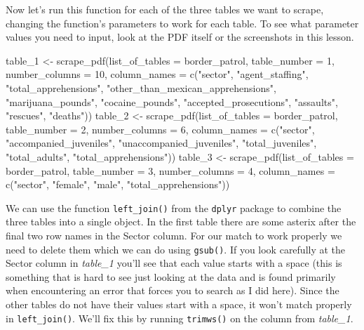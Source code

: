 \documentclass[
]{krantz}
\makeatletter
\newenvironment{Shaded}{\begin{snugshade}}{\end{snugshade}}
\newcommand{\AttributeTok}[1]{\textcolor[rgb]{0.61,0.61,0.61}{#1}}
\newcommand{\DecValTok}[1]{\textcolor[rgb]{0.06,0.06,0.06}{#1}}
\newcommand{\FunctionTok}[1]{\textcolor[rgb]{0,0,0}{#1}}
\newcommand{\NormalTok}[1]{#1}
\newcommand{\OtherTok}[1]{\textcolor[rgb]{0.37,0.37,0.37}{#1}}
\newcommand{\StringTok}[1]{\textcolor[rgb]{0.5,0.5,0.5}{#1}}
\newenvironment{kframe}{%
\medskip{}
\setlength{\fboxsep}{.8em}
 \def\at@end@of@kframe{}%
 \ifinner\ifhmode%
  \def\at@end@of@kframe{\end{minipage}}%
  \begin{minipage}{\columnwidth}%
 \fi\fi%
 \def\FrameCommand##1{\hskip\@totalleftmargin \hskip-\fboxsep
 \colorbox{shadecolor}{##1}\hskip-\fboxsep
     \hskip-\linewidth \hskip-\@totalleftmargin \hskip\columnwidth}%
 \MakeFramed {\advance\hsize-\width
   \@totalleftmargin\z@ \linewidth\hsize
   \@setminipage}}%
 {\par\unskip\endMakeFramed%
 \at@end@of@kframe}
\renewenvironment{Shaded}{\begin{kframe}}{\end{kframe}}
\makeatother
\begin{document}
Now let's run this function for each of the three tables we want to scrape, changing the function's parameters to work for each table. To see what parameter values you need to input, look at the PDF itself or the screenshots in this lesson.

\begin{Shaded}
\begin{Highlighting}[]
\NormalTok{table\_1 }\OtherTok{\textless{}{-}} \FunctionTok{scrape\_pdf}\NormalTok{(}\AttributeTok{list\_of\_tables =}\NormalTok{ border\_patrol, }\AttributeTok{table\_number =} \DecValTok{1}\NormalTok{,}
  \AttributeTok{number\_columns =} \DecValTok{10}\NormalTok{, }\AttributeTok{column\_names =} \FunctionTok{c}\NormalTok{(}\StringTok{"sector"}\NormalTok{, }\StringTok{"agent\_staffing"}\NormalTok{,}
    \StringTok{"total\_apprehensions"}\NormalTok{, }\StringTok{"other\_than\_mexican\_apprehensions"}\NormalTok{,}
    \StringTok{"marijuana\_pounds"}\NormalTok{, }\StringTok{"cocaine\_pounds"}\NormalTok{, }\StringTok{"accepted\_prosecutions"}\NormalTok{,}
    \StringTok{"assaults"}\NormalTok{, }\StringTok{"rescues"}\NormalTok{, }\StringTok{"deaths"}\NormalTok{))}
\NormalTok{table\_2 }\OtherTok{\textless{}{-}} \FunctionTok{scrape\_pdf}\NormalTok{(}\AttributeTok{list\_of\_tables =}\NormalTok{ border\_patrol, }\AttributeTok{table\_number =} \DecValTok{2}\NormalTok{,}
  \AttributeTok{number\_columns =} \DecValTok{6}\NormalTok{, }\AttributeTok{column\_names =} \FunctionTok{c}\NormalTok{(}\StringTok{"sector"}\NormalTok{, }\StringTok{"accompanied\_juveniles"}\NormalTok{,}
    \StringTok{"unaccompanied\_juveniles"}\NormalTok{, }\StringTok{"total\_juveniles"}\NormalTok{, }\StringTok{"total\_adults"}\NormalTok{,}
    \StringTok{"total\_apprehensions"}\NormalTok{))}
\NormalTok{table\_3 }\OtherTok{\textless{}{-}} \FunctionTok{scrape\_pdf}\NormalTok{(}\AttributeTok{list\_of\_tables =}\NormalTok{ border\_patrol, }\AttributeTok{table\_number =} \DecValTok{3}\NormalTok{,}
  \AttributeTok{number\_columns =} \DecValTok{4}\NormalTok{, }\AttributeTok{column\_names =} \FunctionTok{c}\NormalTok{(}\StringTok{"sector"}\NormalTok{, }\StringTok{"female"}\NormalTok{,}
    \StringTok{"male"}\NormalTok{, }\StringTok{"total\_apprehensions"}\NormalTok{))}
\end{Highlighting}
\end{Shaded}

We can use the function \texttt{left\_join()} from the \texttt{dplyr} package to combine the three tables into a single object. In the first table there are some asterix after the final two row names in the Sector column. For our match to work properly we need to delete them which we can do using \texttt{gsub()}. If you look carefully at the Sector column in \emph{table\_1} you'll see that each value starts with a space (this is something that is hard to see just looking at the data and is found primarily when encountering an error that forces you to search as I did here). Since the other tables do not have their values start with a space, it won't match properly in \texttt{left\_join()}. We'll fix this by running \texttt{trimws()} on the column from \emph{table\_1}.
\end{document}
